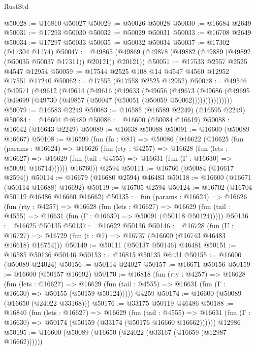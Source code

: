 \begin{lexlean}{RustStd}
\begin{coremodule}
{\begin{coremodule}
{{{{{{{{{{{{{{{{{{{{{{{{{{{{{{{{{{{{{{{{{{{{{{{{{{{{{{{@50028 := @16810 @50027
@50029 := @50026 @50028
@50030 := @16684 @2649
@50031 := @17293 @50030
@50032 := @50029 @50031
@50033 := @16708 @2649
@50034 := @17297 @50033
@50035 := @50032 @50034
@50037 := @17302 (@17304 @1174)
@50047 := @49865 (@49869 (@49878 (@49882 (@49889 (@49892 (@50035 @50037 @17311)) @20121)) @20121))
@50051 := @17533 @2557 @2525 @4547 @12954
@50059 := @17544 @2525 @108 @14 @4547 @4560 @12952 @17551 @17240
@50062 := @17555 (@17558 @2525 @12952)
@50078 := @49546
    (@49571
      (@49612
        (@49614
          (@49616
            (@49633
              (@49656
                (@49673
                  (@49686
                    (@49695 (@49699 (@49730 (@49857 (@50047 (@50051 (@50059 @50062)))))))))))))))
@50079 := @16583 @2249
@50083 := @16585 (@16589 @2249) (@16595 @2249)
@50084 := @16604 @46480
@50086 := @16600 (@50084 @16619)
@50088 := @16642 (@16643 @2249)
@50089 := @16638 @50088
@50091 := @16600 (@50089 @16667)
@50108 := @16599
    (fun (fn : @81) =>
    @50086
      (@16622
        (@16625
          (fun (params : @16624) =>
          @16626
            (fun (rty : @4257) =>
            @16628
              (fun (lets : @16627) =>
              @16629 (fun (tail : @4555) => @16631 (fun (Γ : @16630) => @50091 @16714))))))
        @16760))
    @2594
@50111 := @16766 (@50084 (@16617 @2594))
@50114 := @16679 (@16680 @2594) @46483
@50118 := @16600 (@16671 (@50114 @16688) @16692)
@50119 := @16705 @2594
@50124 := @16702 (@16704 @50119 @46486 @16660 @16662)
@50135 := fun (params : @16624) =>
  @16626
    (fun (rty : @4257) =>
    @16628
      (fun (lets : @16627) =>
      @16629 (fun (tail : @4555) => @16631 (fun (Γ : @16630) => @50091 (@50118 @50124)))))
@50136 := @16625 @50135
@50137 := @16622 @50136
@50146 := @16728
    (fun (U : @16727) => @16729 (fun (t : @7) => @16737 (@16600 (@16743 @46483 @16618) @16754)))
@50149 := @50111 (@50137 @50146) @46481
@50151 := @16585 @50136 @50146
@50153 := @16815 @50135 @6431
@50155 := @16600 (@50089 @24024)
@50156 := @50114 @24027
@50157 := @16671 @50156
@50159 := @16600 (@50157 @16692)
@50170 := @16818
    (fun (rty : @4257) =>
    @16628
      (fun (lets : @16627) =>
      @16629 (fun (tail : @4555) => @16631 (fun (Γ : @16630) => @50155 (@50159 @50124)))))
    @4259
@50174 := @16600 (@50089 (@16650 (@24022 @33168)))
@50176 := @33175 @50119 @46486
@50188 := @16840
    (fun (lets : @16627) =>
    @16629
      (fun (tail : @4555) =>
      @16631 (fun (Γ : @16630) => @50174 (@50159 (@33174 (@50176 @16660 @16662))))))
    @12986
@50195 := @16600 (@50089 (@16650 (@24022 (@33167 (@16659 (@12987 @16662))))))
}}}}}}}}}}}}}}}}}}}}}}}}}}}}}}}}}}}}}}}}}}}}}}}}}}}}}}}
\end{coremodule}}
\end{coremodule}
\end{lexlean}
